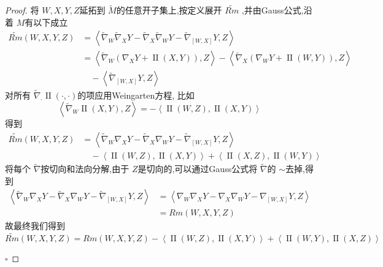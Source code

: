 \documentclass[../../几何与拓扑.tex]{subfiles}
\begin{document}
\begin{proof}
    将 \(  W,X,Y,Z  \)延拓到 \(  \tilde{M}  \)的任意开子集上,按定义展开 \(  \widetilde{Rm}  \) ,并由Gauss公式,沿着 \(  M  \)有以下成立 \[
    \begin{aligned}
    \widetilde{Rm}\left( W,X,Y,Z \right)&= \left< \tilde{\nabla} _{W} \tilde{\nabla} _{X}Y- \tilde{\nabla} _{X} \tilde{\nabla} _{W}Y- \tilde{\nabla} _{\left[ W,X \right] }Y,Z \right>  \\ 
     & = \left< \tilde{\nabla} _{W}\left(  \nabla _{X}Y+ \operatorname{II} \left( X,Y \right)  \right),Z  \right>- \left< \tilde{\nabla} _{X}\left(  \nabla _{W}Y+ \operatorname{II} \left( W,Y \right)  \right),Z  \right>\\ 
    &\quad    -\left< \tilde{\nabla} _{\left[ W,X \right] }Y,Z \right>
    \end{aligned}
    \]    对所有 \( \tilde{\nabla} _{\cdot }  \operatorname{II} \left( \cdot ,\cdot  \right)   \)的项应用Weingarten方程, 比如 \[
    \left< \tilde{\nabla} _{W}\operatorname{II} \left( X,Y \right),Z  \right>= - \left<\operatorname{II} \left( W,Z \right),\operatorname{II} \left( X,Y \right)   \right>
    \]得到 \[
  \begin{aligned}
   \widetilde{Rm}\left( W,X,Y,Z \right)&= \left< \tilde{\nabla} _{W} \nabla _{X}Y- \tilde{\nabla} _{X} \nabla _{W}Y- \tilde{\nabla} _{\left[ W,X \right] } Y,Z\right> \\ 
     &\quad - \left<\operatorname{II} \left( W,Z \right),\operatorname{II} \left( X,Y \right)   \right>+ \left<\operatorname{II} \left( X,Z \right),\operatorname{II} \left( W,Y \right)   \right>
  \end{aligned}
    \]将每个 \(   \tilde{\nabla}   \)按切向和法向分解,由于 \(  Z   \)是切向的,可以通过Gauss公式将 \(   \tilde{\nabla}   \)的 \(  \sim   \)去掉,得到 \[
\begin{aligned}
    \left< \tilde{\nabla} _{W} \nabla _{X}Y- \tilde{\nabla} _{X} \nabla _{W}Y- \tilde{\nabla} _{\left[ W,X \right] }Y,Z \right>&= \left< \nabla _{W} \nabla _{X}Y- \nabla _{X} \nabla _{W}Y- \nabla _{\left[ W,X \right] }Y,Z \right> \\ 
     & =  Rm\left( W,X,Y,Z \right) 
\end{aligned}
    \]    故最终我们得到 \[
    \widetilde{Rm}\left( W,X,Y,Z \right)= Rm\left( W,X,Y,Z \right)-\left<\operatorname{II} \left( W,Z \right),\operatorname{II} \left( X,Y \right)   \right>+ \left<\operatorname{II} \left( W,Y \right),\operatorname{II} \left( X,Z \right)   \right>  
    \]

    \hfill $\square$
\end{proof}
\end{document}
